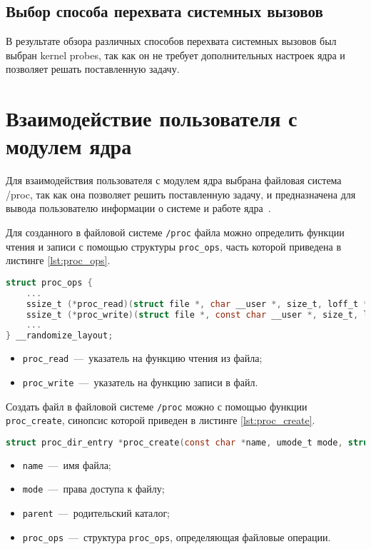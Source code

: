 \subsection{Выбор способа перехвата системных вызовов}

В результате обзора различных способов перехвата системных вызовов был выбран kernel probes, так как он не требует дополнительных настроек ядра и позволяет решать поставленную задачу.

\section{Взаимодействие пользователя с модулем ядра}

Для взаимодействия пользователя с модулем ядра выбрана файловая система /proc, так как она позволяет решить поставленную задачу, и предназначена для вывода пользователю информации о системе и работе ядра~\cite{procfs}.

Для созданного в файловой системе \texttt{/proc} файла можно определить функции чтения и записи с помощью структуры \texttt{proc\_ops}, часть которой приведена в листинге \ref{lst:proc_ops}.

\begin{lstlisting}[language=C, label=lst:proc_ops, caption={Структура \texttt{proc\_ops}}]
struct proc_ops {
	...
	ssize_t	(*proc_read)(struct file *, char __user *, size_t, loff_t *);
	ssize_t	(*proc_write)(struct file *, const char __user *, size_t, loff_t *);
	...
} __randomize_layout;
\end{lstlisting}

\begin{itemize}
	\item \texttt{proc\_read}~---~указатель на функцию чтения из файла;
	\item \texttt{proc\_write}~---~указатель на функцию записи в файл.
\end{itemize}

Создать файл в файловой системе \texttt{/proc} можно с помощью функции \texttt{proc\_create}, синопсис которой приведен в листинге \ref{lst:proc_create}.

\begin{lstlisting}[language=C, label=lst:proc_create, caption={Синопсис функции \texttt{proc\_create}}]
struct proc_dir_entry *proc_create(const char *name, umode_t mode, struct proc_dir_entry *parent, const struct proc_ops *proc_ops);
\end{lstlisting}

\begin{itemize}
	\item \texttt{name}~---~имя файла;
	\item \texttt{mode}~---~права доступа к файлу;
	\item \texttt{parent}~---~родительский каталог;
	\item \texttt{proc\_ops}~---~структура \texttt{proc\_ops}, определяющая файловые операции.
\end{itemize}

